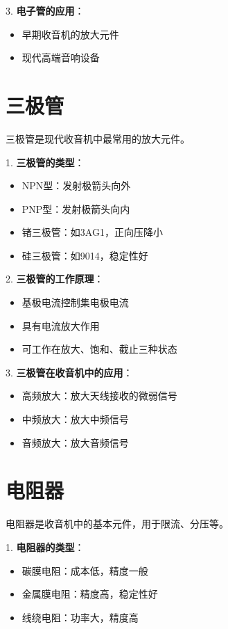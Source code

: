 \documentclass[12pt,UTF8]{ctexbook}
\begin{document}
3. \textbf{电子管的应用}：
   \begin{itemize}[leftmargin=3.5em]
   \item 早期收音机的放大元件
   \item 现代高端音响设备
   \end{itemize}

\section{三极管}

三极管是现代收音机中最常用的放大元件。

1. \textbf{三极管的类型}：
   \begin{itemize}[leftmargin=3.5em]
   \item NPN型：发射极箭头向外
   \item PNP型：发射极箭头向内
   \item 锗三极管：如3AG1，正向压降小
   \item 硅三极管：如9014，稳定性好
   \end{itemize}

2. \textbf{三极管的工作原理}：
   \begin{itemize}[leftmargin=3.5em]
   \item 基极电流控制集电极电流
   \item 具有电流放大作用
   \item 可工作在放大、饱和、截止三种状态
   \end{itemize}

3. \textbf{三极管在收音机中的应用}：
   \begin{itemize}[leftmargin=3.5em]
   \item 高频放大：放大天线接收的微弱信号
   \item 中频放大：放大中频信号
   \item 音频放大：放大音频信号
   \end{itemize}

\section{电阻器}

电阻器是收音机中的基本元件，用于限流、分压等。

1. \textbf{电阻器的类型}：
   \begin{itemize}[leftmargin=3.5em]
   \item 碳膜电阻：成本低，精度一般
   \item 金属膜电阻：精度高，稳定性好
   \item 线绕电阻：功率大，精度高
   \end{itemize}
\end{document}
